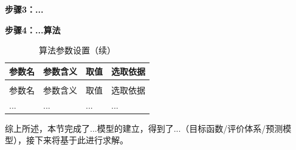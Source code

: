 \textbf{步骤3：...}


\textbf{步骤4：...算法}


\begin{longtable}{>{\centering\arraybackslash}p{}>{\raggedright\arraybackslash}p{}>{\centering\arraybackslash}p{}>{\raggedright\arraybackslash}p{}}
  \caption{算法参数设置}
  \label{tab:参数1} \\
  \toprule
  参数名 & 参数含义 & 取值 & 选取依据 \\
  \midrule
  \endfirsthead
  \caption{算法参数设置（续）} \\
  \toprule
  参数名 & 参数含义 & 取值 & 选取依据 \\
  \midrule
  \endhead
  \bottomrule
  \endfoot
  ... & ... & ... & ... \\
\end{longtable}

综上所述，本节完成了...模型的建立，得到了...（目标函数/评价体系/预测模型），接下来将基于此进行求解。
